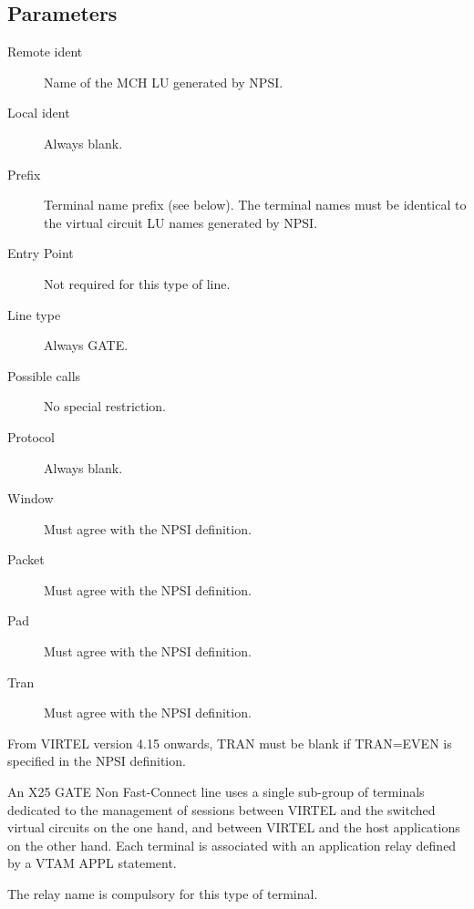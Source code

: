 \documentclass[letterpaper,10pt,english]{sphinxmanual}
\begin{document}
\subsection{Parameters}
\label{\detokenize{connectivity_guide:id28}}\label{\detokenize{connectivity_guide:index-62}}\begin{description}
\item[{Remote ident}] \leavevmode
Name of the MCH LU generated by NPSI.

\item[{Local ident}] \leavevmode
Always blank.

\item[{Prefix}] \leavevmode
Terminal name prefix (see below). The terminal names must be
identical to the virtual circuit LU names generated by NPSI.

\item[{Entry Point}] \leavevmode
Not required for this type of line.

\item[{Line type}] \leavevmode
Always GATE.

\item[{Possible calls}] \leavevmode
No special restriction.

\item[{Protocol}] \leavevmode
Always blank.

\item[{Window}] \leavevmode
Must agree with the NPSI definition.

\item[{Packet}] \leavevmode
Must agree with the NPSI definition.

\item[{Pad}] \leavevmode
Must agree with the NPSI definition.

\item[{Tran}] \leavevmode
Must agree with the NPSI definition.

\end{description}

From VIRTEL version 4.15 onwards, TRAN must be blank if TRAN=EVEN is specified in the NPSI definition.

An X25 GATE Non Fast-Connect line uses a single sub-group of terminals dedicated to the management of sessions between VIRTEL and the switched virtual circuits on the one hand, and between VIRTEL and the host applications on the other hand. Each terminal is associated with an application relay defined by a VTAM APPL statement.

The relay name is compulsory for this type of terminal.
\end{document}
